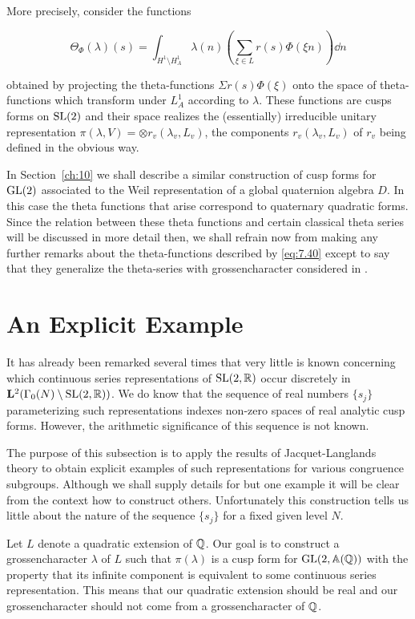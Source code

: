 More precisely, consider the functions

\begin{equation}\label{eq:7.40}
\Theta_{\Phi}(\lambda)(s) = \int_{H^1 \setminus H_A^1} \lambda(n)\left(\sum_{\xi \in L} r(s)\Phi(\xi n)\right) \dd n\tag{7.40}
\end{equation}

obtained by projecting the theta-functions $\Sigma r(s)\Phi(\xi)$ onto the space of theta-functions which transform under $L_A^1$ according to $\lambda$. These functions are cusps forms on $\operatorname{SL}(2)$ and their space realizes the (essentially) irreducible unitary representation $\pi(\lambda, V) = \otimes r_v(\lambda_v, L_v)$, the components $r_v(\lambda_v, L_v)$ of $r_v$ being defined in the obvious way.

In Section~\ref{ch:10} we shall describe a similar construction of cusp forms for $\operatorname{GL}(2)$ associated to the Weil representation of a global quaternion algebra $D$. In this case the theta functions that arise correspond to quaternary quadratic forms. Since the relation between these theta functions and certain classical theta series will be discussed in more detail then, we shall refrain now from making any further remarks about the theta-functions described by \eqref{eq:7.40} except to say that they generalize the theta-series with grossencharacter considered in \cite{Maass}.

\section{An Explicit Example}\label{sec:7c}

It has already been remarked several times that very little is known concerning which continuous series representations of $\operatorname{SL}(2,\mathbb{R})$ occur discretely in $\mathbf{L}^2(\Gamma_0(N)\setminus\operatorname{SL}(2,\mathbb{R}))$. We do know that the sequence of real numbers $\{s_j\}$ parameterizing such representations indexes non-zero spaces of real analytic cusp forms. However, the arithmetic significance of this sequence is not known.

The purpose of this subsection is to apply the results of Jacquet-Langlands theory to obtain explicit examples of such representations for various congruence subgroups. Although we shall supply details for but one example it will be clear from the context how to construct others. Unfortunately this construction tells us little about the nature of the sequence $\{s_j\}$ for a fixed given level $N$.

Let $L$ denote a quadratic extension of $\mathbb{Q}$. Our goal is to construct a grossencharacter $\lambda$ of $L$ such that $\pi(\lambda)$ is a cusp form for $\operatorname{GL}(2,\mathbb{A}(\mathbb{Q}))$ with the property that its infinite component is equivalent to some continuous series representation. This means that our quadratic extension should be real and our grossencharacter should not come from a grossencharacter of $\mathbb{Q}$.

